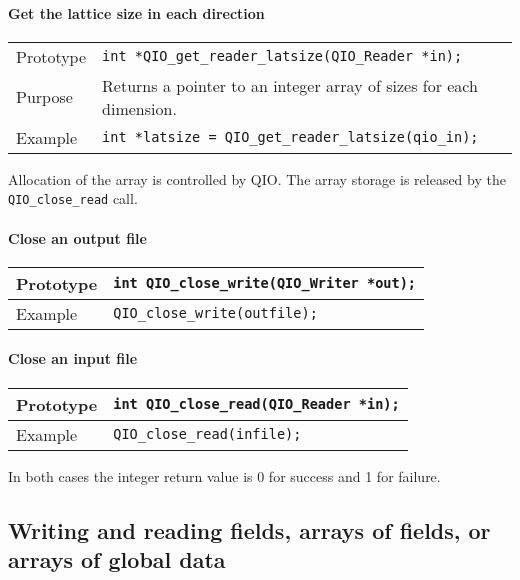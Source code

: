 \documentclass{article}
\begin{document}
\paragraph{Get the lattice size in each direction}

\begin{flushleft}
  \begin{tabular}{|l|l|}
  \hline
  Prototype      & \verb|int *QIO_get_reader_latsize(QIO_Reader *in);| \\
  Purpose        & Returns a pointer to an integer array of sizes for each dimension. \\
\hline
  Example  & \verb|int *latsize = QIO_get_reader_latsize(qio_in);|\\
   \hline
 \end{tabular}
\end{flushleft}
%
Allocation of the array is controlled by QIO\@.  The array storage is
released by the \verb|QIO_close_read| call.

\paragraph{Close an output file}

\begin{flushleft}
  \begin{tabular}{|l|l|}
  \hline
  Prototype      & \verb|int QIO_close_write(QIO_Writer *out);| \\
\hline
  Example  & \verb|QIO_close_write(outfile);|\\
   \hline
 \end{tabular}
\end{flushleft}

\paragraph{Close an input file}

\begin{flushleft}
  \begin{tabular}{|l|l|}
  \hline
  Prototype      & \verb|int QIO_close_read(QIO_Reader *in);| \\
\hline
  Example  & \verb|QIO_close_read(infile);|\\
   \hline
 \end{tabular}
\end{flushleft}

In both cases the integer return value is 0 for success and 1 for failure.

\subsection{Writing and reading fields, arrays of fields, or arrays of global data}
\end{document}
